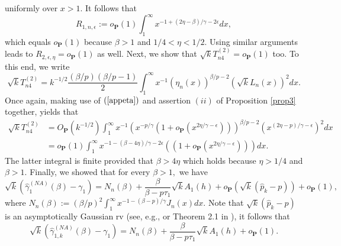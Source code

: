 \documentclass[reqno,openbib,runningheads,a4paper,12pt]{amsart}%
\begin{document}
uniformly over $x>1.$ It follows that
\[
R_{1,n,\epsilon}:=o_{\mathbf{P}}\left(  1\right)  \int_{1}^{\infty
}x^{-1+\left(  2\eta-\beta\right)  /\gamma-2\epsilon}dx,
\]
which equals $o_{\mathbf{P}}\left(  1\right)  $ because $\beta>1$ and
$1/4<\eta<1/2.$ Using similar arguments leads to $R_{2,\epsilon,\eta
}=o_{\mathbf{P}}\left(  1\right)  $ as well. Next, we show that $\sqrt
{k}T_{n4}^{\left(  2\right)  }=o_{\mathbf{P}}\left(  1\right)  $ too. To this
end, we write%
\[
\sqrt{k}T_{n4}^{\left(  2\right)  }=k^{-1/2}\frac{\left(  \beta/p\right)
\left(  \beta/p-1\right)  }{2}\int_{1}^{\infty}x^{-1}\left(  \eta_{n}\left(
x\right)  \right)  ^{\beta/p-2}\left(  \sqrt{k}L_{n}\left(  x\right)  \right)
^{2}dx.
\]
Once again, making use of $\left(  \ref{appeta}\right)  $ and assertion
$\left(  ii\right)  $ of Proposition \ref{prop3} together, yields that%
\begin{align*}
\sqrt{k}T_{n4}^{\left(  2\right)  } &  =O_{\mathbf{P}}\left(  k^{-1/2}\right)
\int_{1}^{\infty}x^{-1}\left(  x^{-p/\gamma}\left(  1+o_{\mathbf{P}}\left(
x^{2\eta/\gamma-\epsilon}\right)  \right)  \right)  ^{\beta/p-2}\left(
x^{\left(  2\eta-p\right)  /\gamma-\epsilon}\right)  ^{2}dx\\
&  =o_{\mathbf{P}}\left(  1\right)  \int_{1}^{\infty}x^{-1-\left(  \beta
-4\eta\right)  /\gamma-2\epsilon}\left(  \left(  1+o_{\mathbf{P}}\left(
x^{2\eta/\gamma-\epsilon}\right)  \right)  \right)  dx.
\end{align*}
The latter integral is finite provided that $\beta>4\eta$ which holds because
$\eta>1/4$ and $\beta>1.$ Finally, we showed that for every $\beta>1,$ we have%
\begin{equation}
\sqrt{k}\left(  \widehat{\gamma}_{1}^{\left(  NA\right)  }\left(
\beta\right)  -\gamma_{1}\right)  =N_{n}\left(  \beta\right)  +\frac{\beta
}{\beta-p\tau_{1}}\sqrt{k}A_{1}\left(  h\right)  +o_{\mathbf{P}}\left(
\sqrt{k}\left(  \widehat{p}_{k}-p\right)  \right)  +o_{\mathbf{P}}\left(
1\right)  ,\label{final-app}%
\end{equation}
where $N_{n}\left(  \beta\right)  :=\left(  \beta/p\right)  ^{2}\int%
_{1}^{\infty}x^{-1-\left(  \beta-p\right)  /\gamma}J_{n}\left(  x\right)  dx.$
Note that $\sqrt{k}\left(  \widehat{p}_{k}-p\right)  $ is an asymptotically
Gaussian rv (see, e.g., \cite{EnFG08} or Theorem 2.1 in \cite{BMN-2015}), it
follows that%
\[
\sqrt{k}\left(  \widehat{\gamma}_{1,k}^{\left(  NA\right)  }\left(
\beta\right)  -\gamma_{1}\right)  =N_{n}\left(  \beta\right)  +\frac{\beta
}{\beta-p\tau_{1}}\sqrt{k}A_{1}\left(  h\right)  +o_{\mathbf{P}}\left(
1\right)  .
\]
\end{document}
